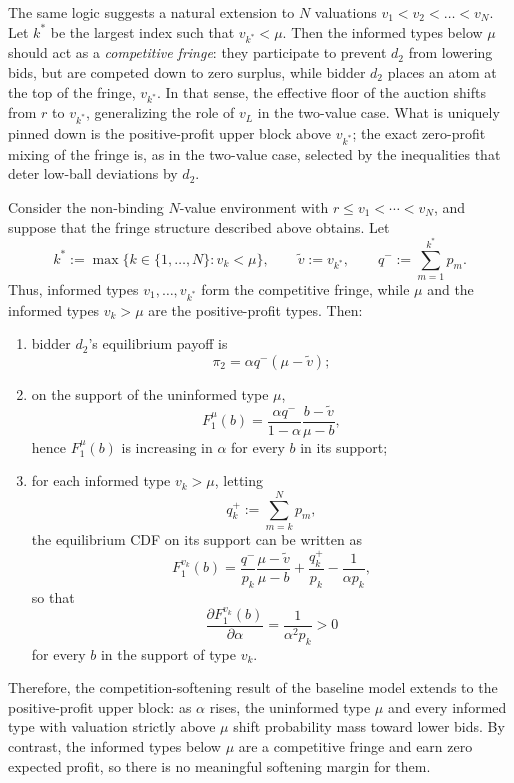 \begin{rem}
The same logic suggests a natural extension to $N$ valuations $v_1 < v_2 < \dots < v_N$. Let $k^*$ be the largest index such that $v_{k^*} < \mu$. Then the informed types below $\mu$ should act as a \textit{competitive fringe}: they participate to prevent $d_2$ from lowering bids, but are competed down to zero surplus, while bidder $d_2$ places an atom at the top of the fringe, $v_{k^*}$. In that sense, the effective floor of the auction shifts from $r$ to $v_{k^*}$, generalizing the role of $v_L$ in the two-value case. What is uniquely pinned down is the positive-profit upper block above $v_{k^*}$; the exact zero-profit mixing of the fringe is, as in the two-value case, selected by the inequalities that deter low-ball deviations by $d_2$.
\end{rem}

\begin{prop}\label{prop:nonbinding-N-softening}
Consider the non-binding $N$-value environment with $r \leq v_1 < \cdots < v_N$, and suppose that the fringe structure described above obtains. Let
\[
k^* := \max\{k \in \{1,\ldots,N\} : v_k < \mu\}, \qquad \tilde{v} := v_{k^*}, \qquad q^- := \sum_{m=1}^{k^*} p_m.
\]
Thus, informed types $v_1,\ldots,v_{k^*}$ form the competitive fringe, while $\mu$ and the informed types $v_k > \mu$ are the positive-profit types. Then:
\begin{enumerate}
    \item bidder $d_2$'s equilibrium payoff is
    \[
    \pi_2 = \alpha q^- (\mu - \tilde{v});
    \]

    \item on the support of the uninformed type $\mu$,
    \[
    F_1^{\mu}(b) = \frac{\alpha q^-}{1-\alpha}\frac{b-\tilde{v}}{\mu-b},
    \]
    hence $F_1^{\mu}(b)$ is increasing in $\alpha$ for every $b$ in its support;

    \item for each informed type $v_k > \mu$, letting
    \[
    q_k^+ := \sum_{m=k}^{N} p_m,
    \]
    the equilibrium CDF on its support can be written as
    \[
    F_1^{v_k}(b) = \frac{q^-}{p_k}\frac{\mu-\tilde{v}}{\mu-b} + \frac{q_k^+}{p_k} - \frac{1}{\alpha p_k},
    \]
    so that
    \[
    \frac{\partial F_1^{v_k}(b)}{\partial \alpha} = \frac{1}{\alpha^2 p_k} > 0
    \]
    for every $b$ in the support of type $v_k$.
\end{enumerate}
Therefore, the competition-softening result of the baseline model extends to the positive-profit upper block: as $\alpha$ rises, the uninformed type $\mu$ and every informed type with valuation strictly above $\mu$ shift probability mass toward lower bids. By contrast, the informed types below $\mu$ are a competitive fringe and earn zero expected profit, so there is no meaningful softening margin for them.
\end{prop}


